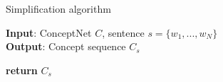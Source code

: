 
\begin{algorithm}[tb]
\small
\caption{Simplification algorithm}
\label{alg:simplify}
\textbf{Input}: ConceptNet $C$, sentence $s=\{w_1, ..., w_N\}$\\
\textbf{Output}: Concept sequence $C_s$ 
\begin{algorithmic}[1] %
      \EndIf
    \EndFor
  \EndFor
   \EndIf
  \EndFor 
  \State \textbf{return} {$C_s$ }
  \EndProcedure
\end{algorithmic}
\end{algorithm}

